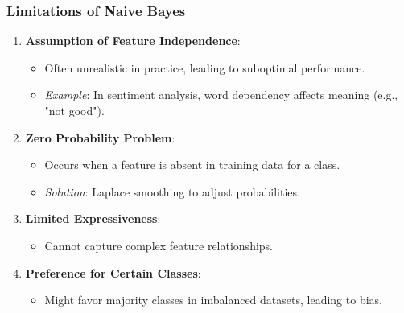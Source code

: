 \documentclass[aspectratio=169]{beamer}
\begin{document}
\begin{frame}[fragile]
    \frametitle{Limitations of Naive Bayes}
    \begin{enumerate}
        \item \textbf{Assumption of Feature Independence}:
        \begin{itemize}
            \item Often unrealistic in practice, leading to suboptimal performance.
            \item \textit{Example}: In sentiment analysis, word dependency affects meaning (e.g., "not good").
        \end{itemize}

        \item \textbf{Zero Probability Problem}:
        \begin{itemize}
            \item Occurs when a feature is absent in training data for a class.
            \item \textit{Solution}: Laplace smoothing to adjust probabilities.
        \end{itemize}
        
        \item \textbf{Limited Expressiveness}:
        \begin{itemize}
            \item Cannot capture complex feature relationships.
        \end{itemize}
        
        \item \textbf{Preference for Certain Classes}:
        \begin{itemize}
            \item Might favor majority classes in imbalanced datasets, leading to bias.
        \end{itemize}
    \end{enumerate}
\end{frame}
\end{document}
